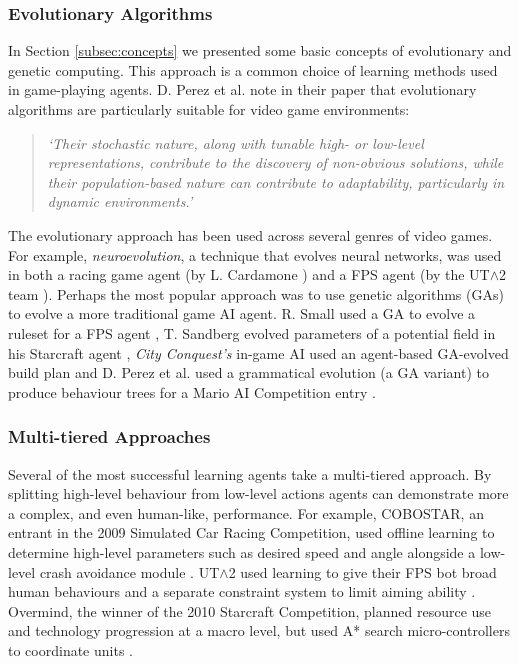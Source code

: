 \subsubsection{Evolutionary Algorithms}

In Section \ref{subsec:concepts} we presented some basic concepts of evolutionary and genetic computing. This approach is a common choice of learning methods used in game-playing agents. D. Perez et al. note in their paper \cite[p.~1]{gramev} that evolutionary algorithms are particularly suitable for video game environments: 
\begin{quote}\itshape
`Their stochastic nature, along with tunable high- or low-level representations, contribute to the discovery of non-obvious solutions, while their population-based nature can contribute to adaptability, particularly in dynamic environments.'
\end{quote}
The evolutionary approach has been used across several genres of video games. For example, \emph{neuroevolution}, a technique that evolves neural networks, was used in both a racing game agent (by L. Cardamone \cite[p.~137]{scrc}) and a FPS agent (by the UT$\wedge$2 team \cite{2kbot}). Perhaps the most popular approach was to use genetic algorithms (GAs) to evolve a more traditional game AI agent. R. Small used a GA to evolve a ruleset for a FPS agent \cite{agentsmith}, T. Sandberg evolved parameters of a potential field in his Starcraft agent \cite{emapf} , \emph{City Conquest's} in-game AI used an agent-based GA-evolved build plan \cite{evolutioningamedesign} and D. Perez et al. used a grammatical evolution (a GA variant) to produce behaviour trees for a Mario AI Competition entry \cite{gramev}.

\subsubsection{Multi-tiered Approaches}

Several of the most successful learning agents take a multi-tiered approach. By splitting high-level behaviour from low-level actions agents can demonstrate more a complex, and even human-like, performance. For example, COBOSTAR, an entrant in the 2009 Simulated Car Racing Competition, used offline learning to determine high-level parameters such as desired speed and angle alongside a low-level crash avoidance module \cite[p.~136]{scrc}. UT$\wedge$2 used learning to give their FPS bot broad human behaviours and a separate constraint system to limit aiming ability \cite{2kbot}.  Overmind, the winner of the 2010 Starcraft Competition, planned resource use and technology progression at a macro level, but used A* search micro-controllers to coordinate units \cite{overmind}. 

